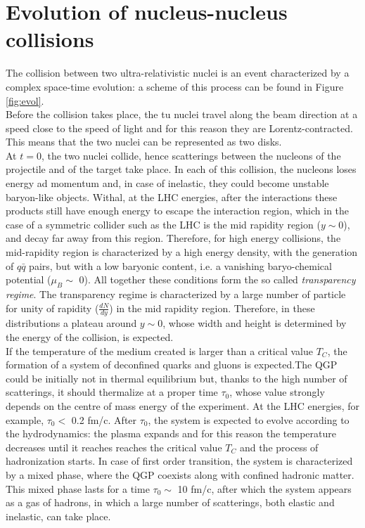 \section{Evolution of nucleus-nucleus collisions}
The collision between two ultra-relativistic nuclei is an event characterized by a complex space-time evolution: a scheme of this process can be found in Figure \ref{fig:evol}.\\
Before the collision takes place, the tu nuclei travel along the beam direction at a speed close to the speed of light and for this reason they are Lorentz-contracted. This means that the two nuclei can be represented as two disks.\\
At $t=0$, the two nuclei collide, hence scatterings between the nucleons of the projectile and of the target take place. In each of this collision, the nucleons loses energy ad momentum and, in case of inelastic, they could become unstable baryon-like objects. Withal, at the LHC energies, after the interactions these products still have enough energy to escape the interaction region, which in the case of a symmetric collider such as the LHC is the mid rapidity region ($y\sim0$), and decay far away from this region. Therefore, for high energy collisions, the mid-rapidity region is characterized by a high energy density, with the generation of $q\bar{q}$ pairs, but with a low baryonic content, i.e. a vanishing baryo-chemical potential ($\mu_{B}\sim$ 0). All together these conditions form the so called \textit{transparency regime}. The transparency regime is characterized by a large number of particle for unity of rapidity ($\frac{dN}{dy}$) in the mid rapidity region. Therefore, in these distributions a plateau around $y\sim0$, whose width and height is determined by the energy of the collision, is expected.\\
If the temperature of the medium created is larger than a critical value $T_{C}$, the formation of a system of deconfined quarks and gluons is expected.The QGP could be initially not in thermal equilibrium but, thanks to the high number of scatterings, it should thermalize at a proper time $\tau_{0}$, whose value strongly depends on the centre of mass energy of the experiment. At the LHC energies, for example, $\tau_{0}<$ 0.2 fm/c. After $\tau_{0}$, the system is expected to evolve according to the hydrodynamics: the plasma expands and for this reason the temperature decreases until it reaches reaches the critical value $T_{C}$ and the process of hadronization starts. In case of first order transition, the system is characterized by a mixed phase, where the QGP coexists along with confined hadronic matter. This mixed phase lasts for a time $\tau_{0}\sim$ 10 fm/c, after which the system appears as a gas of hadrons, in which a large number of scatterings, both elastic and inelastic, can take place.
